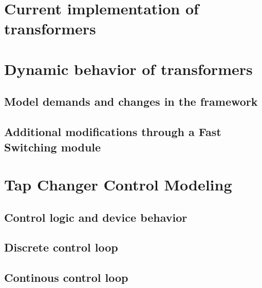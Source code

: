 \section{Current implementation of transformers}


\section{Dynamic behavior of transformers}


\subsection{Model demands and changes in the framework}
\subsection{Additional modifications through a Fast Switching module}

\section{Tap Changer Control Modeling}


\subsection{Control logic and device behavior}
\subsection{Discrete control loop}
\subsection{Continous control loop}